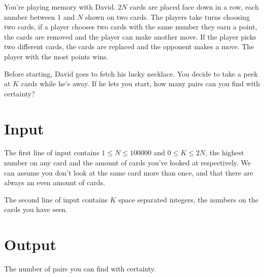 You're playing memory with David. $2N$ cards are placed face down in a row, each number between $1$ and $N$ shown on two cards. The players take turns choosing two cards, if a player chooses two cards with the same number they earn a point, the cards are removed and the player can make another move. If the player picks two different cards, the cards are replaced and the opponent makes a move. The player with the most points wins. 

Before starting, David goes to fetch his lucky necklace. You decide to take a peek at $K$ cards while he's away. If he lets you start, how many pairs can you find with certainty?

\section*{Input}

The first line of input contains $1 \leq N \leq 100000$ and $0 \leq K \leq 2N$, the highest number on any card and the amount of cards you've looked at respectively. We can assume you don't look at the same card more than once, and that there are always an even amount of cards.

The second line of input contains $K$ space separated integers, the numbers on the cards you have seen. 

\section*{Output}

The number of pairs you can find with certainty.
